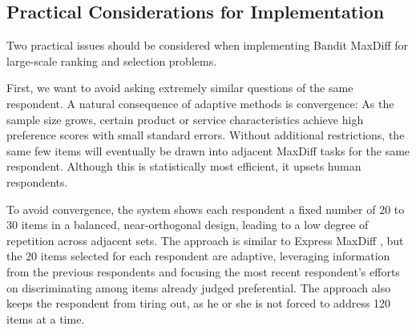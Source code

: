 \documentclass[nonblindrev]{informs3}
\newcommand{\numperset}{L}
\begin{document}
\begin{APPENDICES}
\section{Practical Considerations for Implementation}



Two practical issues should be considered when implementing Bandit MaxDiff for large-scale ranking and selection problems. 

First, we want to avoid asking extremely similar questions of the same respondent. A natural consequence of adaptive methods is convergence: As the sample size grows, certain product or service characteristics achieve high preference scores with small standard errors. Without additional restrictions, the same few items will eventually be drawn into adjacent MaxDiff tasks for the same respondent. Although this is statistically most efficient, it upsets human respondents. 

To avoid convergence, the system shows each respondent a fixed number of 20 to 30 items in a balanced, near-orthogonal design, leading to a low degree of repetition across adjacent sets. The approach is similar to Express MaxDiff \citep{wirth2012largeset}, but the 20 items selected for each respondent are adaptive, leveraging information from the previous respondents and focusing the most recent respondent's efforts on discriminating among items already judged preferential. The approach also keeps the respondent from tiring out, as he or she is not forced to address 120 items at a time.


\end{APPENDICES}
\end{document}

